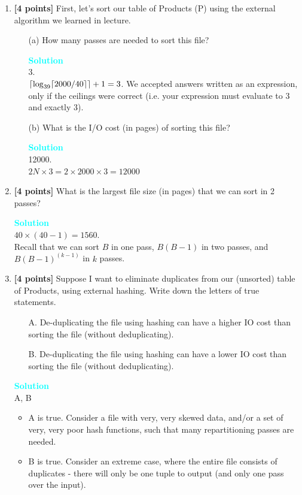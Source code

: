 \documentclass[10pt]{article}
\DeclarePairedDelimiter{\ceil}{\lceil}{\rceil}
\newenvironment{solution}
    { \begin{mdframed}[backgroundcolor=gray!10] \textcolor{cyan}{\textbf{Solution}} \\}
    {  \end{mdframed}}
\begin{document}
\begin{enumerate}
	\item \textbf{[4 points]}
	First, let’s sort our table of Products (P) using the external algorithm we learned in lecture.
	\begin{itemize}
		\item[(a)] How many passes are needed to sort this file?
		\begin{solution}
			3. \\
			$\ceil*{\log_{39} \ceil*{2000/40}}+1 = 3$. 
			We accepted answers written as an expression, 
			only if the ceilings were correct (i.e. your expression must evaluate to 3 and exactly 3).
		\end{solution} 
		\item[(b)] What is the I/O cost (in pages) of sorting this file? 
		\begin{solution}
			12000. \\
			$2N \times 3 = 2 \times 2000 \times 3 = 12000$
		\end{solution}  
	\end{itemize}
	\item \textbf{[4 points]}
	What is the largest file size (in pages) that we can sort in 2 passes?\\
	\begin{solution}
		$40 \times (40-1)=1560$. \\
		Recall that we can sort $B$ in one pass, $B(B-1)$ in two passes, and $B(B-1)^{(k-1)}$ in $k$ passes.
		\end{solution} 
	\item \textbf{[4 points]}
	Suppose I want to eliminate duplicates from our (unsorted) table of Products, 
	using external hashing. Write down the letters of true statements. 
	\begin{itemize}
		\item[A.] De-duplicating the file using hashing can have a higher IO cost than sorting the file (without deduplicating). 
		\item[B.] De-duplicating the file using hashing can have a lower IO cost than sorting the file (without deduplicating). 
	\end{itemize}
	\begin{solution}
		A, B 
		\begin{itemize}
			\item A is true. Consider a file with very, very skewed data, 
			and/or a set of very, very poor hash functions, such that many repartitioning passes are needed.
			\item B is true. Consider an extreme case, where the entire file consists of duplicates - there will 
			only be one tuple to output (and only one pass over the input).
		\end{itemize}
		\end{solution} 
\end{enumerate}
\end{document}
